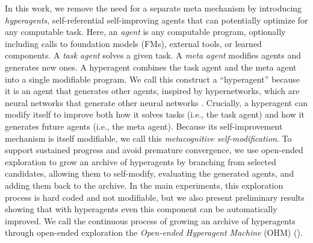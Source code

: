 \documentclass[]{fairmeta}
\begin{document}
In this work, we remove the need for a separate meta mechanism by introducing \textit{hyperagents}, self-referential self-improving agents that can potentially optimize for any computable task. Here, an \textit{agent} is any computable program, optionally including calls to foundation models (FMs), external tools, or learned components. A \textit{task agent} solves a given task. A \textit{meta agent} modifies agents and generates new ones. A hyperagent combines the task agent and the meta agent into a single modifiable program. We call this construct a ``hyperagent'' because it is an agent that generates other agents, inspired by hypernetworks, which are neural networks that generate other neural networks \citep{ha2017hypernetworks}. Crucially, a hyperagent can modify itself to improve both how it solves tasks (i.e., the task agent) and how it generates future agents (i.e., the meta agent). Because its self-improvement mechanism is itself modifiable, we call this \textit{metacognitive self-modification}. To support sustained progress and avoid premature convergence, we use open-ended exploration to grow an archive of hyperagents by branching from selected candidates, allowing them to self-modify, evaluating the generated agents, and adding them back to the archive. In the main experiments, this exploration process is hard coded and not modifiable, but we also present preliminary results showing that with hyperagents even this component can be automatically improved. We call the continuous process of growing an archive of hyperagents through open-ended exploration the \textit{Open-ended Hyperagent Machine} (OHM) ().
\end{document}
